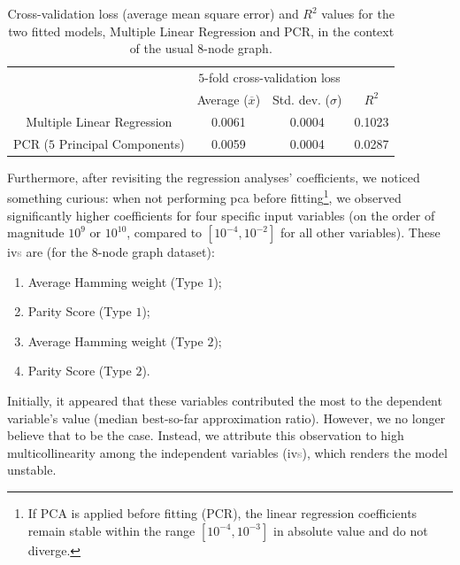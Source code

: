 \begin{table}[H]
  \centering
  \begin{tabular}{|c|cc|c|}
  \hline
  \rowcolor[HTML]{FFFFFF} 
  \cellcolor[HTML]{FFFFFF}                               & \multicolumn{2}{c|}{\cellcolor[HTML]{FFFFFF}$5$-fold cross-validation loss} & \cellcolor[HTML]{FFFFFF} \\ \cline{2-3}
  \rowcolor[HTML]{FFFFFF} 
  \multirow{-2}{*}{\cellcolor[HTML]{FFFFFF}Model ($8$-node graph)} &
    \multicolumn{1}{c|}{\cellcolor[HTML]{FFFFFF}Average ($\overline{x}$)} &
    Std. dev. ($\sigma$) &
    \multirow{-2}{*}{\cellcolor[HTML]{FFFFFF}$R^2$} \\ \hline
  \rowcolor[HTML]{EFEFEF} 
  \cellcolor[HTML]{FFFFFF}Multiple Linear Regression     & \multicolumn{1}{c|}{\cellcolor[HTML]{EFEFEF}0.0061}         & 0.0004        & 0.1023                   \\ \hline
  \rowcolor[HTML]{EFEFEF} 
  \cellcolor[HTML]{FFFFFF}PCR ($5$ Principal Components) & \multicolumn{1}{c|}{\cellcolor[HTML]{EFEFEF}0.0059}         & 0.0004        & 0.0287                   \\ \hline
  \end{tabular}
  \caption{Cross-validation loss (average mean square error) and $R^2$ values for the two fitted models, Multiple Linear Regression and PCR, in the context of the usual $8$-node graph.}
  \label{tab:Scaled_Median_BSF_Table_8-node}
\end{table}

Furthermore, after revisiting the regression analyses' coefficients, we noticed something curious: when not performing \acrshort{pca} before fitting\footnote{If PCA is applied before fitting (PCR), the linear regression coefficients remain stable within the range \([10^{-4}, 10^{-3}]\) in absolute value and do not diverge.}, we observed significantly higher coefficients for four specific input variables (on the order of magnitude \(10^9\) or \(10^{10}\), compared to \([10^{-4}, 10^{-2}]\) for all other variables). These \acrshort{iv}\textcolor{gray}{s} are (for the $8$-node graph dataset):
\begin{enumerate}
    \item Average Hamming weight (Type $1$);
    \item Parity Score (Type $1$);
    \item Average Hamming weight (Type $2$);
    \item Parity Score (Type $2$).
\end{enumerate}
Initially, it appeared that these variables contributed the most to the dependent variable's value (median best-so-far approximation ratio). However, we no longer believe that to be the case. Instead, we attribute this observation to high multicollinearity among the independent variables (\acrshort{iv}\textcolor{gray}{s}), which renders the model unstable.

